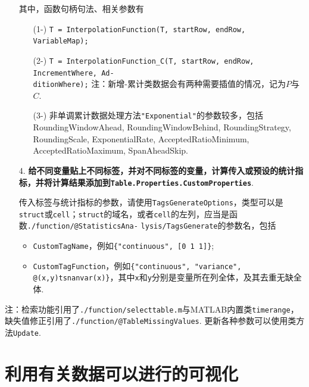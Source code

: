 \documentclass[a4paper, titlepage]{article}
\begin{document}
\begin{enumerate}
{        其中，函数句柄句法、相关参数有
        \begin{enumerate}
            \item [(1-)]\texttt{T = InterpolationFunction(T, startRow, endRow, VariableMap);}
            \item [(2-)]\texttt{T = InterpolationFunction\_C(T, startRow, endRow, IncrementWhere, Ad-}\\\texttt{ditionWhere);} 注：新增-累计类数据会有两种需要插值的情况，记为$P$与$C$.
            \item [(3-)] 非单调累计数据处理方法\texttt{"Exponential"}的参数较多，包括RoundingWindowAhead, RoundingWindowBehind, RoundingStrategy, RoundingScale, ExponentialRate, AcceptedRatioMinimum, AcceptedRatioMaximum, SpanAheadSkip.
        \end{enumerate}
        }
        
        \item [4.] \textbf{给不同变量贴上不同标签，并对不同标签的变量，计算传入或预设的统计指标，并将计算结果添加到\texttt{Table.Properties.CustomProperties}}.
        
        {\kaishu
        传入标签与统计指标的参数，请使用\texttt{TagsGenerateOptions}，类型可以是\texttt{struct}或\texttt{cell}；\texttt{struct}的域名，或者\texttt{cell}的左列，应当是函数\texttt{./function/@StatisticsAna-} \texttt{lysis/TagsGenerate}的参数名，包括
        \begin{itemize}[itemsep=-1pt,topsep=1pt]
            \item \texttt{CustomTagName}，例如\texttt{\{"continuous", [0 1 1]\}};
            \item \texttt{CustomTagFunction}，例如\texttt{\{"continuous", "variance", @(x,y)tsnanvar(x)\}}，其中\texttt{x}和\texttt{y}分别是变量所在列全体，及其去重无缺全体.
        \end{itemize} 
        }
    \end{enumerate}

    注：检索功能引用了\texttt{./function/selecttable.m}与MATLAB内置类\texttt{timerange}，缺失值修正引用了\texttt{./function/@TableMissingValues}. 更新各种参数可以使用类方法\texttt{Update}.

    \section{利用有关数据可以进行的可视化}
\end{document}
